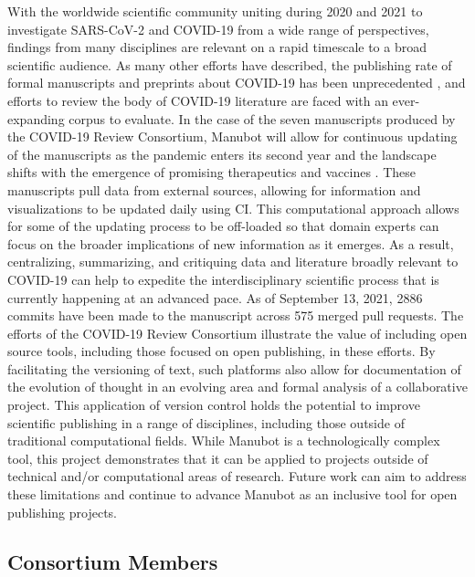 \documentclass[twocolumn]{ceurart}
\begin{document}
With the worldwide scientific community uniting during 2020 and 2021 to investigate SARS-CoV-2 and COVID-19 from a wide range of perspectives, findings from many disciplines are relevant on a rapid timescale to a broad scientific audience.
As many other efforts have described, the publishing rate of formal manuscripts and preprints about COVID-19 has been unprecedented \citep{7ub6VM4Z}, and efforts to review the body of COVID-19 literature are faced with an ever-expanding corpus to evaluate.
In the case of the seven manuscripts produced by the COVID-19 Review Consortium, Manubot will allow for continuous updating of the manuscripts as the pandemic enters its second year and the landscape shifts with the emergence of promising therapeutics and vaccines \citep{cifK9B8t, i2CGFwI3}.
These manuscripts pull data from external sources, allowing for information and visualizations to be updated daily using CI.
This computational approach allows for some of the updating process to be off-loaded so that domain experts can focus on the broader implications of new information as it emerges.
As a result, centralizing, summarizing, and critiquing data and literature broadly relevant to COVID-19 can help to expedite the interdisciplinary scientific process that is currently happening at an advanced pace.
As of September 13, 2021, 2886 commits have been made to the manuscript across 575 merged pull requests.
The efforts of the COVID-19 Review Consortium illustrate the value of including open source tools, including those focused on open publishing, in these efforts.
By facilitating the versioning of text, such platforms also allow for documentation of the evolution of thought in an evolving area and formal analysis of a collaborative project.
This application of version control holds the potential to improve scientific publishing in a range of disciplines, including those outside of traditional computational fields.
While Manubot is a technologically complex tool, this project demonstrates that it can be applied to projects outside of technical and/or computational areas of research.
Future work can aim to address these limitations and continue to advance Manubot as an inclusive tool for open publishing projects.

\hypertarget{consortium-members}{%
\subsection*{Consortium Members}\label{consortium-members}}
\end{document}
